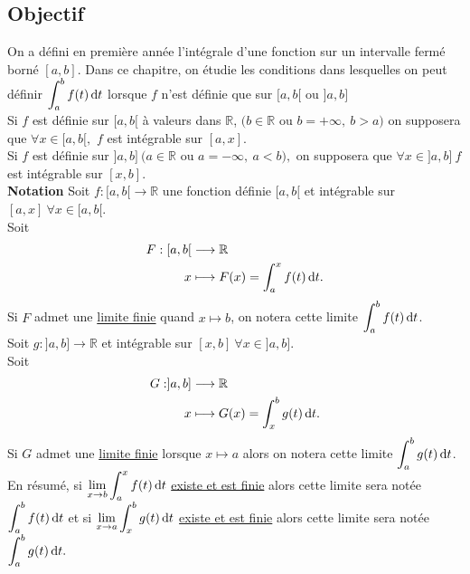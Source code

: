 \documentclass[11pt, a4paper]{book}
\begin{document}
\subsection{Objectif}
On a d\'efini en premi\`ere ann\'ee l'int\'egrale d'une fonction sur un intervalle ferm\'e born\'e $[a,b]$. Dans ce chapitre, on \'etudie les conditions dans lesquelles on peut d\'efinir ${\displaystyle \int_a^b f(t)\,\mathrm{d} t}$ lorsque $f$ n'est d\'efinie que sur $[a,b[$ ou $]a,b]$ \\
Si $f$ est d\'efinie sur $[a,b[$ \`a valeurs dans $ \mathbb{R}$, $(b\in \mathbb{R}$ ou $b=+\infty,~b>a)$ on supposera que $\forall x \in [a,b[,$ $f$ est int\'egrable sur $[a,x].$\\
Si $f$ est d\'efinie sur $]a,b] ~(a\in \mathbb{R} $ ou $a=-\infty,~a<b),$ on supposera que $\forall x\in ]a,b]~f$ est int\'egrable sur $[x,b].$\\
\textbf{Notation}\quad
Soit $f:[a,b[\longrightarrow \mathbb{R}$ une fonction d\'efinie $[a,b[$ et  int\'egrable sur $[a,x]~\forall x\in [a,b[.$\\
Soit \begin{align*} F:[a,b[&\longrightarrow \mathbb{R}\\
x&\longmapsto F(x)=\int_a^x f(t)\,\mathrm{d} t. \end{align*}
Si $F$ admet une \underline{limite finie} quand $x\longmapsto b$, on notera cette limite ${\displaystyle \int_a^b f(t)\,\mathrm{d} t}$.\\
Soit $g:]a,b]\longrightarrow \mathbb{R}$ et int\'egrable sur $[x,b] ~\forall x\in ]a,b].$\\
Soit \begin{align*} G:]a,b]&\longrightarrow \mathbb{R}\\ 
x&\longmapsto G(x)=\int_x^b g(t)\,\mathrm{d} t.\end{align*}
Si $G$ admet une \underline{limite finie} lorsque $x\longmapsto a$ alors on notera cette limite ${\displaystyle \int_a^b g(t)\,\mathrm{d} t}$.\\
En r\'esum\'e, si ${\displaystyle \lim_{x\rightarrow b}\int_a^x f(t)\,\mathrm{d} t}$ \underline{existe et est finie} alors cette limite sera not\'ee ${\displaystyle \int_a^b f(t)\,\mathrm{d} t}$ et si ${\displaystyle \lim_{x\rightarrow a}\int_x^b g(t)\,\mathrm{d} t}$ \underline{existe et est finie} alors cette limite sera not\'ee ${\displaystyle \int_a^b g(t)\,\mathrm{d} t.}$
\end{document}
